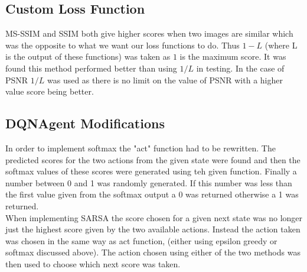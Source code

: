 \documentclass[10pt,twocolumn,letterpaper]{article}
\begin{document}
\FloatBarrier
\subsection{Custom Loss Function}\label{app:loss}
MS-SSIM and SSIM both give higher scores when two images are similar which was the opposite to what we want our loss functions to do. Thus $1-L$ (where L is the output of these functions) was taken as $1$ is the maximum score. It was found this method performed better than using $1/L$ in testing. In the case of PSNR $1/L$ was used as there is no limit on the value of PSNR with a higher value score being better. 

\subsection{DQNAgent Modifications}\label{app:modifications}
In order to implement softmax the "act" function had to be rewritten. The predicted scores for the two actions from the given state were found and then the softmax values of these scores were generated using teh given function. Finally a number between 0 and 1 was randomly generated. If this number was less than the first value given from the softmax output a 0 was returned otherwise a 1 was returned. \\
When implementing SARSA the score chosen for a given next state was no longer just the highest score given by the two available actions. Instead the action taken was chosen in the same way as act function, (either using epsilon greedy or softmax discussed above). The action chosen using either of the two methods was then used to choose which next score was taken.
\end{document}

